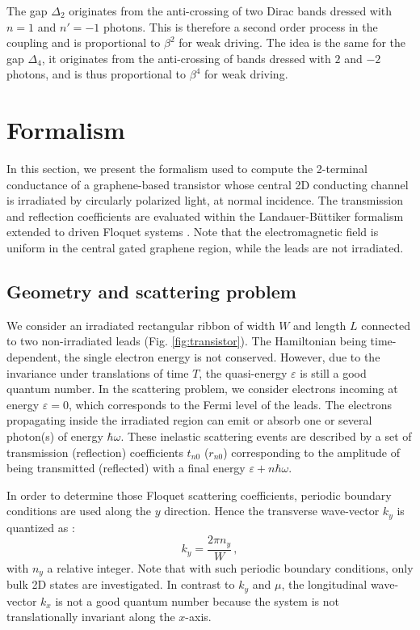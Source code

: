 \documentclass[aps,prb,showpacs,superscriptaddress,twocolumn,10pt,floatfix]{revtex4-1}
\newcommand{\ep}{\varepsilon}
\begin{document}
The gap $\Delta_2$ originates from the anti-crossing of two Dirac bands dressed with $n=1$ and $n'=-1$ photons. This is therefore a second order process in the coupling and is proportional to $\beta^2$ for weak driving. The idea is the same for the gap $\Delta_4$, it originates from the anti-crossing of bands dressed with $2$ and $-2$ photons, and is thus proportional to $\beta^4$ for weak driving.



\section{Formalism}

In this section, we present the formalism used to compute the 2-terminal conductance of a graphene-based transistor whose central 2D conducting channel is irradiated by circularly polarized light, at normal incidence. The transmission and reflection coefficients are evaluated within the Landauer-B\"{u}ttiker formalism extended to driven Floquet systems \cite{Moskalets2002}. Note that the electromagnetic field is uniform in the central gated graphene region, while the leads are not irradiated. 


\subsection{Geometry and scattering problem}

We consider an irradiated rectangular ribbon of width $W$ and length $L$ connected to two non-irradiated leads (Fig. \ref{fig:transistor}). The Hamiltonian being time-dependent, the single electron energy is not conserved. However, due to the invariance under translations of time $T$, the quasi-energy $\ep$ is still a good quantum number. In the scattering problem, we consider electrons incoming at energy $\ep=0$, which corresponds to the Fermi level of the leads. The electrons propagating inside the irradiated region can emit or absorb one or several photon(s) of energy $\hbar\omega$. These inelastic scattering events are described by a set of transmission (reflection) coefficients $t_{n0}$ ($r_{n0}$) corresponding to the amplitude of being transmitted (reflected) with a final energy $\ep +n  \hbar \omega$.  

In order to determine those Floquet scattering coefficients, periodic boundary conditions are used along the $y$ direction. Hence the transverse wave-vector $k_y$ is quantized as :
\begin{equation}
k_y=\frac{2\pi n_y}{W} \, ,
\end{equation}
with $n_y$ a relative integer. Note that with such periodic boundary conditions, only bulk 2D states are investigated. In contrast to $k_y$ and $\mu$, the longitudinal wave-vector $k_x$ is not a good quantum number because the system is not translationally invariant along the $x$-axis. 
\end{document}
